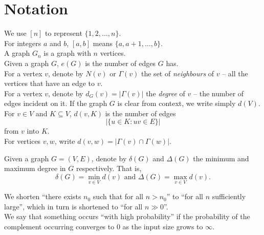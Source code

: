 \section{Notation}
	We use $[n]$ to represent $\{1,2,\ldots,n\}$.\\

	For integers $a$ and $b$, $[a,b]$ means $\{a,a+1,\ldots,b\}$.\\

	A graph $G_n$ is a graph with $n$ vertices.\\

	Given a graph $G$, $e(G)$ is the number of edges $G$ has.\\

	For a vertex $v$, denote by $N(v)$ or $\Gamma(v)$ the set of \emph{neighbours} of $v$ -- all the vertices that have an edge to $v$.\\

	For a vertex $v$, denote by $d_G(v) = |\Gamma(v)|$ the \emph{degree} of $v$ -- the number of edges incident on it. If the graph $G$ is clear from context, we write simply $d(V)$. \\
	
	For $v \in V$ and $K \subseteq V$, $d(v,K)$ is the number of edges
	\[ \left|\{ u \in K : uv \in E \}\right| \]
	from $v$ into $K$.\\

	For vertices $v,w$, write $d(v,w) = |\Gamma(v) \cap \Gamma(w)|$.
	
	Given a graph $G = (V,E)$, denote by $\delta(G)$ and $\Delta(G)$ the minimum and maximum degree in $G$ respectively. That is,
	\[ \delta(G) = \min_{v \in V} d(v) \text{ and } \Delta(G) = \max_{v \in V} d(v). \]

	We shorten ``there exists $n_0$ such that for all $n > n_0$'' to ``for all $n$ sufficiently large'', which in turn is shortened to ``for all $n\gg 0$''.\\

	We say that something occurs ``with high probability'' if the probability of the complement occurring converges to $0$ as the input size grows to $\infty$.

\clearpage